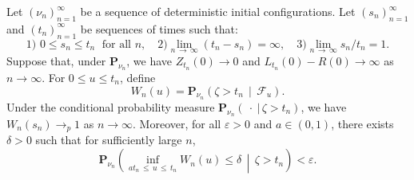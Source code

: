 \documentclass[AHL,Unicode,longabstracts,published]{cedram}
\newcommand*\eps{\varepsilon}
\renewcommand*\P{\mathbf{P}}
\newcommand\F{\mathcal{F}}
\newcommand{\1} {\mathds{1}}
\begin{document}
\begin{lemm}\label{MGsurvival}
Let $(\nu_n)_{n=1}^{\infty}$ be a sequence of deterministic initial configurations. Let $(s_n)_{n=1}^{\infty}$ and $(t_n)_{n=1}^{\infty}$ be sequences of times such that:
\begin{equation}\label{sntn}
\text{1) } 0 \leq s_n \leq t_n \;\text{ for all } n, \quad\text{2)} \lim_{n\,\rightarrow\,\infty} (t_n - s_n) = \infty, \quad\text{3)}\lim_{n\,\rightarrow\,\infty} s_n/t_n = 1.
\end{equation}
Suppose that, under $\P_{\nu_n}$, we have $Z_{t_n}(0) \rightarrow 0$ and $L_{t_n}(0) - R(0) \rightarrow \infty$ as $n \rightarrow \infty$. For $0 \leq u \leq t_n$, define
\begin{equation}\label{Wdef}
W_n(u) = \P_{\nu_n}\left(\zeta > t_n \,\middle|\, \F_u\right).
\end{equation}
Under the conditional probability measure $\P_{\nu_n}(\: \cdot \:|\,\zeta > t_n)$, we have $W_n(s_n) \rightarrow_p 1$ as $n \rightarrow \infty$. Moreover, for all $\eps > 0$ and $a \in (0, 1)$, there exists $\delta > 0$ such that for sufficiently large $n$,
\begin{equation}\label{infW}
\P_{\nu_n}\left(\inf_{at_n\,\leq\,u\,\leq\,t_n} W_n(u) \leq \delta \,\middle|\, \zeta > t_n \right) < \eps.
\end{equation}
\end{lemm}
\end{document}
